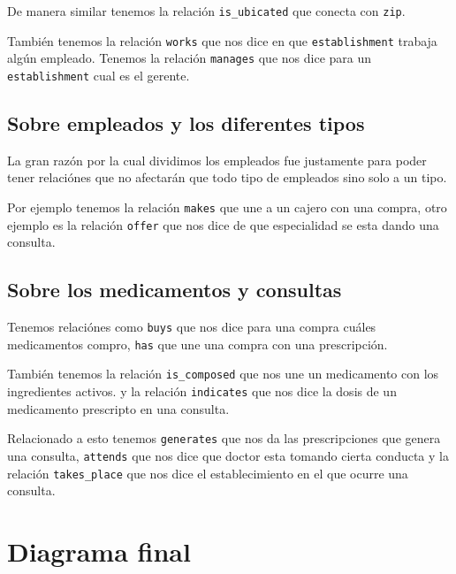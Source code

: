 \documentclass[12pt, fleqn]{report}                             %
\theoremstyle{break}                                            %
\begin{document}
            De manera similar tenemos la relación \texttt{is\_ubicated} que conecta con \texttt{zip}.

            También tenemos la relación \texttt{works} que nos dice en que \texttt{establishment} trabaja algún empleado.
            Tenemos la relación \texttt{manages} que nos dice para un \texttt{establishment} cual es el gerente.

        \subsection{Sobre empleados y los diferentes tipos}

            La gran razón por la cual dividimos los empleados fue justamente para poder tener relaciónes que no afectarán
            que todo tipo de empleados sino solo a un tipo.

            Por ejemplo tenemos la relación \texttt{makes} que une a un cajero con una compra,
            otro ejemplo es la relación \texttt{offer} que nos dice de que especialidad se esta dando una consulta.


        \subsection{Sobre los medicamentos y consultas}

            Tenemos relaciónes como \texttt{buys} que nos dice para una compra cuáles medicamentos compro,
            \texttt{has} que une una compra con una prescripción.

            También tenemos la relación \texttt{is\_composed} que nos une un medicamento con los ingredientes activos.
            y la relación \texttt{indicates} que nos dice la dosis de un medicamento prescripto en una consulta.

            Relacionado a esto tenemos \texttt{generates} que nos da las prescripciones que genera una consulta,
            \texttt{attends} que nos dice que doctor esta tomando cierta conducta y la relación \texttt{takes\_place}
            que nos dice el establecimiento en el que ocurre una consulta. 


      \section{Diagrama final}
\end{document}
